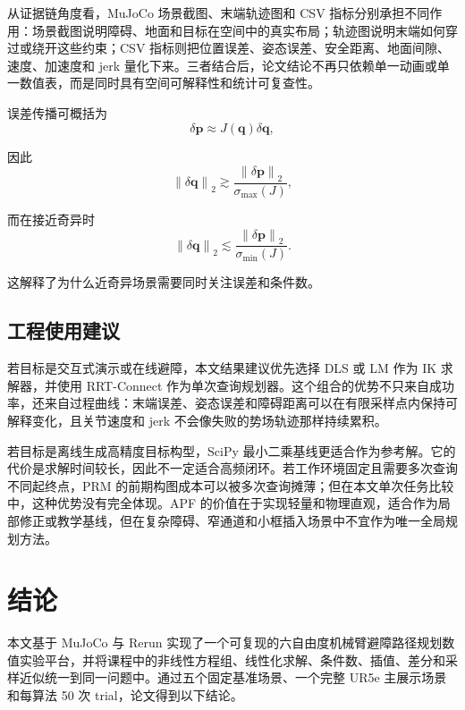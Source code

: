 \documentclass[UTF8,zihao=-4]{ctexart}
\newcommand{\norm}[1]{\left\lVert #1 \right\rVert}
\begin{document}
从证据链角度看，MuJoCo 场景截图、末端轨迹图和 CSV 指标分别承担不同作用：场景截图说明障碍、地面和目标在空间中的真实布局；轨迹图说明末端如何穿过或绕开这些约束；CSV 指标则把位置误差、姿态误差、安全距离、地面间隙、速度、加速度和 jerk 量化下来。三者结合后，论文结论不再只依赖单一动画或单一数值表，而是同时具有空间可解释性和统计可复查性。

误差传播可概括为
\begin{equation}
  \delta\bm p
  \approx
  J(\bm q)\delta\bm q ,
  \label{eq:error-prop}
\end{equation}

因此
\begin{equation}
  \norm{\delta\bm q}_2
  \gtrsim
  \frac{\norm{\delta\bm p}_2}{\sigma_{\max}(J)} ,
  \label{eq:error-lower}
\end{equation}

而在接近奇异时
\begin{equation}
  \norm{\delta\bm q}_2
  \lesssim
  \frac{\norm{\delta\bm p}_2}{\sigma_{\min}(J)} .
  \label{eq:error-upper}
\end{equation}

这解释了为什么近奇异场景需要同时关注误差和条件数。

\subsection{工程使用建议}
若目标是交互式演示或在线避障，本文结果建议优先选择 DLS 或 LM 作为 IK 求解器，并使用 RRT-Connect 作为单次查询规划器。这个组合的优势不只来自成功率，还来自过程曲线：末端误差、姿态误差和障碍距离可以在有限采样点内保持可解释变化，且关节速度和 jerk 不会像失败的势场轨迹那样持续累积。

若目标是离线生成高精度目标构型，SciPy 最小二乘基线更适合作为参考解。它的代价是求解时间较长，因此不一定适合高频闭环。若工作环境固定且需要多次查询不同起终点，PRM 的前期构图成本可以被多次查询摊薄；但在本文单次任务比较中，这种优势没有完全体现。APF 的价值在于实现轻量和物理直观，适合作为局部修正或教学基线，但在复杂障碍、窄通道和小框插入场景中不宜作为唯一全局规划方法。

\section{结论}
本文基于 MuJoCo 与 Rerun 实现了一个可复现的六自由度机械臂避障路径规划数值实验平台，并将课程中的非线性方程组、线性化求解、条件数、插值、差分和采样近似统一到同一问题中。通过五个固定基准场景、一个完整 UR5e 主展示场景和每算法 50 次 trial，论文得到以下结论。
\end{document}
